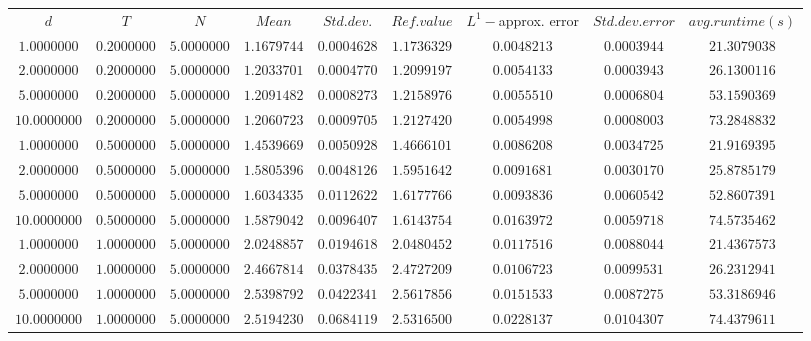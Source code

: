 \begin{tabular}{ccccccccc}
$d$ & $T$ & $N$ & $Mean$ & $Std. dev.$ & $Ref. value$ & $L^1-$approx. error & $Std. dev. error$ & $avg. runtime (s)$\\
$1.0000000$ & $0.2000000$ & $5.0000000$ & $1.1679744$ & $0.0004628$ & $1.1736329$ & $0.0048213$ & $0.0003944$ & $21.3079038$\\
$2.0000000$ & $0.2000000$ & $5.0000000$ & $1.2033701$ & $0.0004770$ & $1.2099197$ & $0.0054133$ & $0.0003943$ & $26.1300116$\\
$5.0000000$ & $0.2000000$ & $5.0000000$ & $1.2091482$ & $0.0008273$ & $1.2158976$ & $0.0055510$ & $0.0006804$ & $53.1590369$\\
$10.0000000$ & $0.2000000$ & $5.0000000$ & $1.2060723$ & $0.0009705$ & $1.2127420$ & $0.0054998$ & $0.0008003$ & $73.2848832$\\
$1.0000000$ & $0.5000000$ & $5.0000000$ & $1.4539669$ & $0.0050928$ & $1.4666101$ & $0.0086208$ & $0.0034725$ & $21.9169395$\\
$2.0000000$ & $0.5000000$ & $5.0000000$ & $1.5805396$ & $0.0048126$ & $1.5951642$ & $0.0091681$ & $0.0030170$ & $25.8785179$\\
$5.0000000$ & $0.5000000$ & $5.0000000$ & $1.6034335$ & $0.0112622$ & $1.6177766$ & $0.0093836$ & $0.0060542$ & $52.8607391$\\
$10.0000000$ & $0.5000000$ & $5.0000000$ & $1.5879042$ & $0.0096407$ & $1.6143754$ & $0.0163972$ & $0.0059718$ & $74.5735462$\\
$1.0000000$ & $1.0000000$ & $5.0000000$ & $2.0248857$ & $0.0194618$ & $2.0480452$ & $0.0117516$ & $0.0088044$ & $21.4367573$\\
$2.0000000$ & $1.0000000$ & $5.0000000$ & $2.4667814$ & $0.0378435$ & $2.4727209$ & $0.0106723$ & $0.0099531$ & $26.2312941$\\
$5.0000000$ & $1.0000000$ & $5.0000000$ & $2.5398792$ & $0.0422341$ & $2.5617856$ & $0.0151533$ & $0.0087275$ & $53.3186946$\\
$10.0000000$ & $1.0000000$ & $5.0000000$ & $2.5194230$ & $0.0684119$ & $2.5316500$ & $0.0228137$ & $0.0104307$ & $74.4379611$\\
\end{tabular}
